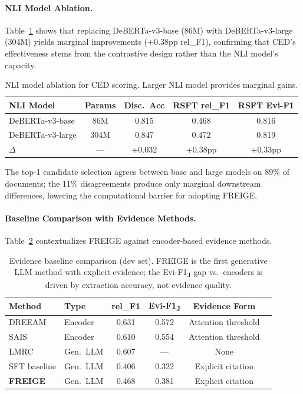 \documentclass[11pt,a4paper]{article}
\newcommand{\method}{FREIGE}
\newcommand{\ced}{CED}
\newcommand{\rsft}{RSFT}
\begin{document}
\paragraph{NLI Model Ablation.}
Table~\ref{tab:nli_ablation} shows that replacing DeBERTa-v3-base (86M) with DeBERTa-v3-large (304M) yields marginal improvements (+0.38pp rel\_F1), confirming that \ced{}'s effectiveness stems from the contrastive design rather than the NLI model's capacity.

\begin{table}[t]
\centering
\small
\caption{NLI model ablation for CED scoring. Larger NLI model provides marginal gains.}
\label{tab:nli_ablation}
\begin{tabular}{@{}lcccc@{}}
\toprule
\textbf{NLI Model} & \textbf{Params} & \textbf{Disc.\ Acc} & \textbf{\rsft{} rel\_F1} & \textbf{\rsft{} Evi-F1} \\
\midrule
DeBERTa-v3-base  & 86M  & 0.815 & 0.468 & 0.816 \\
DeBERTa-v3-large & 304M & 0.847 & 0.472 & 0.819 \\
\midrule
$\Delta$ & --- & +0.032 & +0.38pp & +0.33pp \\
\bottomrule
\end{tabular}
\end{table}

The top-1 candidate selection agrees between base and large models on 89\% of documents; the 11\% disagreements produce only marginal downstream differences, lowering the computational barrier for adopting \method{}.

\paragraph{Baseline Comparison with Evidence Methods.}
Table~\ref{tab:evidence_comparison} contextualizes \method{} against encoder-based evidence methods.

\begin{table}[t]
\centering
\small
\caption{Evidence baseline comparison (dev set). \method{} is the first generative LLM method with explicit evidence; the Evi-F1\textsubscript{J} gap vs.\ encoders is driven by extraction accuracy, not evidence quality.}
\label{tab:evidence_comparison}
\begin{tabular}{@{}llcccc@{}}
\toprule
\textbf{Method} & \textbf{Type} & \textbf{rel\_F1} & \textbf{Evi-F1\textsubscript{J}} & \textbf{Evidence Form} \\
\midrule
DREEAM      & Encoder  & 0.631 & 0.572 & Attention threshold \\
SAIS        & Encoder  & 0.610 & 0.554 & Attention threshold \\
LMRC        & Gen.\ LLM & 0.607 & ---   & None \\
SFT baseline & Gen.\ LLM & 0.406 & 0.322 & Explicit citation \\
\textbf{\method{}} & Gen.\ LLM & 0.468 & 0.381 & Explicit citation \\
\bottomrule
\end{tabular}
\end{table}
\end{document}

